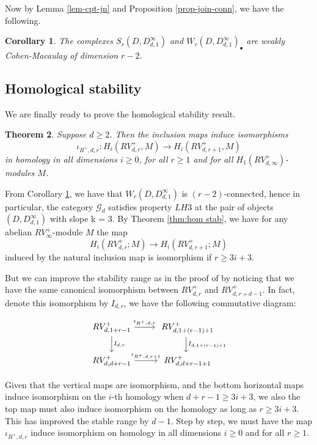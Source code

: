 \documentclass[11pt, a4paper]{amsart}
\newtheorem{thm}{Theorem}[section]
\newtheorem{cor}[thm]{Corollary}
\theoremstyle{definition}
\def\Proof{\noindent{\bf Proof.}\quad}
\begin{document}
Now by Lemma \ref{lem-cpt-jn} and Proposition \ref{prop-join-conn}, we have the following.

\begin{cor}\label{cor-Sr-conn}
The complexes $S_r(D,D^{\infty}_{d,1})$ and $W_r(D,D^{\infty}_{d,1})_\bullet$ are weakly Cohen-Macaulay of dimension $r-2$.
\end{cor}




\subsection{Homological stability} We are finally ready to prove the homological stability result.

\begin{thm}\label{thm-hmg-stab-RB+}
Suppose $d\geq 2$. Then the inclusion maps induce isomorphisms
$$ \iota_{R^+,d,r}: H_i(RV^+_{d,r},M) \to H_i(RV^+_{d,r+1},M)$$
in homology in all dimensions $i \geq 0$, for all $r \geq  1$ and for all $H_1(RV^+_{d,\infty})$-modules $M$.
\end{thm}


\Proof From Corollary \ref{cor-Sr-conn},
we have that $W_r(D, D_{d,1}^\infty)$ is $(r - 2)$-connected, hence in particular, the category $\mathcal{G}_d$ satisfies property $LH3$ at the pair of objects $(D, D_{d,1}^\infty)$ with slope k = 3. By Theorem \ref{thm:hom stab},  we have for any abelian $RV^+_{\infty}$-module $M$ the map
\[H_i(RV^+_{d,r}; M )  \longrightarrow H_i(RV^+_{d,r+1}; M)\]
induced by the natural inclusion map is isomorphism if   $r \geq 3i+3$. 



But we can improve the stability range as in the proof of \cite[Theorem 3.6]{SW19} by noticing that we have the same canonical isomorphism between $RV^+_{d,r}$ and $RV^+_{d,r+d-1}$. In fact, denote this isomorphism by $I_{d,r}$, we have the following commutative diagram:

\[\begin{tikzcd}
RV^+_{d,1+ r-1 }\arrow[d,"I_{d,r}"] \arrow[r, "\iota_{R^+,d,r}"] & ~ RV^+_{d,1+(r-1) +1}\arrow[d,"I_{d,{1+(r-1) +1}}"] \\
RV^+_{d,{d+{r-1}}}  \arrow[r, "\iota_{R^+,d,r +1}"] & ~RV^+_{d,{d+{r-1}+1}}
\end{tikzcd}
\]

Given that the vertical maps are isomorphism, and the bottom horizontal maps induce isomorphism on the $i$-th homology when   $d+r-1 \geq 3i+3$, we also the top map must also induce isomorphism on the homology as long as   $r \geq 3i+3$. This has improved the stable range by $d-1$. Step by step, we must have the map $\iota_{R^+,d,r}$ induce isomorphism on homology in  all dimensions $i\geq 0$ and for all $r\geq 1$. 
\end{document}
